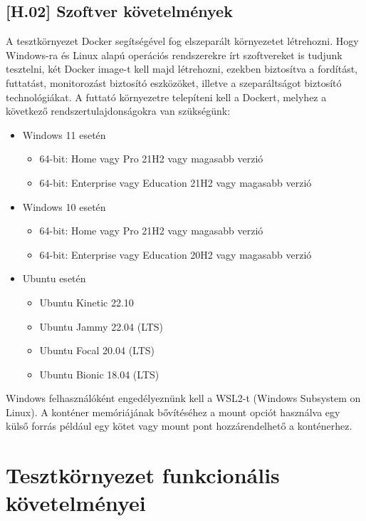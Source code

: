 \documentclass{scrreprt}
\begin{document}
\subsection{[H.02] Szoftver követelmények} \label{H.02}
A tesztkörnyezet Docker segítségével fog elszeparált környezetet létrehozni. Hogy Windows-ra és Linux alapú operációs rendszerekre írt szoftvereket is tudjunk
tesztelni, két Docker image-t kell majd létrehozni, ezekben biztosítva a fordítást, futtatást, monitorozást biztosító eszközöket, illetve a szeparáltságot
biztosító technológiákat. A futtató környezetre telepíteni kell a Dockert, melyhez a következő rendszertulajdonságokra van szükségünk:
\begin{itemize}
      \item Windows 11 esetén
            \begin{itemize}
                  \item 64-bit: Home vagy Pro 21H2 vagy magasabb verzió
                  \item 64-bit: Enterprise vagy Education 21H2 vagy magasabb verzió
            \end{itemize}
      \item Windows 10 esetén
            \begin{itemize}
                  \item 64-bit: Home vagy Pro 21H2 vagy magasabb verzió
                  \item 64-bit: Enterprise vagy Education 20H2 vagy magasabb verzió
            \end{itemize}
      \item Ubuntu esetén
            \begin{itemize}
                  \item Ubuntu Kinetic 22.10
                  \item Ubuntu Jammy 22.04 (LTS)
                  \item Ubuntu Focal 20.04 (LTS)
                  \item Ubuntu Bionic 18.04 (LTS)
            \end{itemize}
\end{itemize}
Windows felhasználóként engedélyeznünk kell a WSL2-t (Windows Subsystem on Linux).
A konténer memóriájának bővítéséhez a mount opciót használva egy külső forrás például egy kötet vagy mount pont hozzárendelhető a konténerhez.

\section{Tesztkörnyezet funkcionális követelményei}
\end{document}
